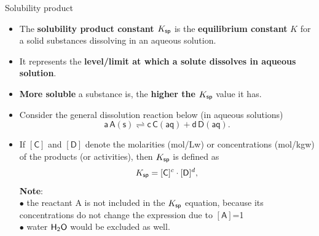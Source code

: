 %
%
\begin{frame}{Solubility product}
	\small
	\begin{itemize}
		\item The \alert{\bf solubility product constant $K_{\sf sp}$} is the {\bf equilibrium constant} $K$ for a solid substances 
		dissolving in an aqueous solution.
		\pause
		\item It represents the {\bf level/limit at which a solute dissolves in aqueous solution}.
		\pause
		\item {\bf More soluble} a substance is, the {\bf higher the $K_{\sf sp}$} value it has.
		\pause
		\item Consider the general dissolution reaction below (in aqueous solutions)
		\[
		\mathsf{a\, A(s) \rightleftharpoons c\, C(aq) + d\, D (aq)}.
		\]
		\vskip -10pt
		\pause
		\item If $\mathsf{[C]}$ and  $\mathsf{[D]}$ denote the molarities  (mol/Lw) or concentrations (mol/kgw) of the products (or activities), then $K_{\sf sp} $ is defined as
		\[
		K_{\sf sp} = [\mathsf{C}]^c \cdot [\mathsf{D}]^d,
		\] 
		{\bf Note}: \\
		\quad $\bullet$ the reactant A is not included in the $K_{\sf sp}$  equation, because its concentrations do not change the expression
		due to $\mathsf{[A]}$=1 \\
		\quad $\bullet$ water ${\sf H_2O}$ would be excluded as well.	
	\end{itemize}
\end{frame}
%
%

